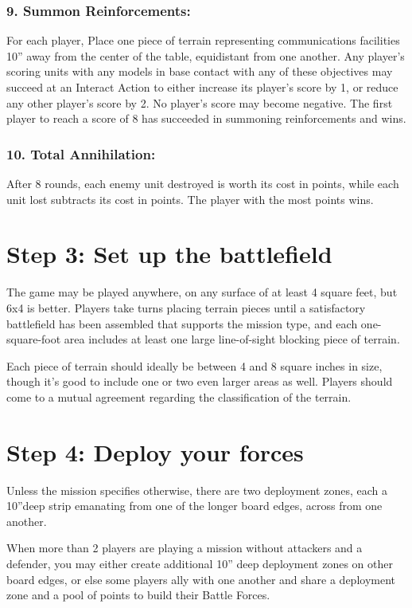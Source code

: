 \begin{multicols}{2}
\subsubsection*{9. Summon Reinforcements:} For each player, Place one piece of terrain representing communications facilities 10'' away from the center of the table, equidistant from one another. Any player's scoring units with any models in base contact with any of these objectives may succeed at an Interact Action to either increase its player's score by 1, or reduce any other player's score by 2. No player's score may become negative. The first player to reach a score of 8 has succeeded in summoning reinforcements and wins.

\subsubsection*{10. Total Annihilation:} After 8 rounds, each enemy unit destroyed is worth its cost in points, while each unit lost subtracts its cost in points. The player with the most points wins.




\section*{Step 3: Set up the battlefield}
The game may be played anywhere, on any surface of at least 4 square feet, but 6x4 is better. Players take turns placing terrain pieces until a satisfactory battlefield has been assembled that supports the mission type, and each one-square-foot area includes at least one large line-of-sight blocking piece of terrain.

Each piece of terrain should ideally be between 4 and 8 square inches in size, though it's good to include one or two even larger areas as well. Players should come to a mutual agreement regarding the classification of the terrain.




\section*{Step 4: Deploy your forces}
Unless the mission specifies otherwise, there are two deployment zones, each a 10''deep strip emanating from one of the longer board edges, across from one another.

When more than 2 players are playing a mission without attackers and a defender, you may either create additional 10'' deep deployment zones on other board edges, or else some players ally with one another and share a deployment zone and a pool of points to build their Battle Forces.


\end{multicols}
